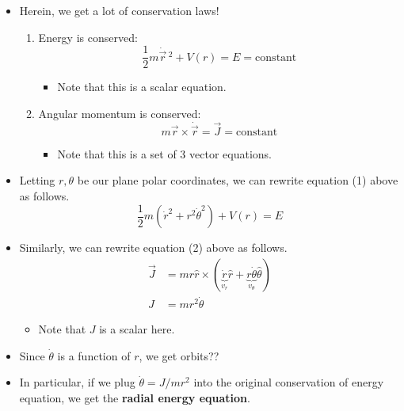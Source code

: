 \documentclass[../notes.tex]{subfiles}
\begin{document}
\begin{itemize}
    \begin{itemize}
        \item Herein, we get a lot of conservation laws!
        \begin{enumerate}
            \item Energy is conserved:
            \begin{equation*}
                \frac{1}{2}m\dot{\vec{r}}{\,}^2+V(r) = E = \text{constant}
            \end{equation*}
            \begin{itemize}
                \item Note that this is a scalar equation.
            \end{itemize}
            \item Angular momentum is conserved:
            \begin{equation*}
                m\vec{r}\times\dot{\vec{r}} = \vec{J} = \text{constant}
            \end{equation*}
            \begin{itemize}
                \item Note that this is a set of 3 vector equations.
            \end{itemize}
        \end{enumerate}
        \item Letting $r,\theta$ be our plane polar coordinates, we can rewrite equation (1) above as follows.
        \begin{equation*}
            \frac{1}{2}m(\dot{r}^2+r^2\dot{\theta}^2)+V(r) = E
        \end{equation*}
        \item Similarly, we can rewrite equation (2) above as follows.
        \begin{align*}
            \vec{J} &= mr\hat{r}\times(\underbrace{\dot{r}}_{v_r}\hat{r}+\underbrace{r\dot{\theta}}_{v_\theta}\hat{\theta})\\
            J &= mr^2\dot{\theta}
        \end{align*}
        \begin{itemize}
            \item Note that $J$ is a scalar here.
        \end{itemize}
        \item Since $\dot{\theta}$ is a function of $r$, we get orbits??
        \item In particular, if we plug $\dot{\theta}=J/mr^2$ into the original conservation of energy equation, we get the \textbf{radial energy equation}.

\end{itemize}
\end{itemize}
\end{document}
